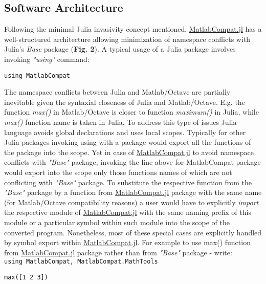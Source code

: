 \subsection{Software Architecture}
\label{Architecture} 

Following the minimal Julia invasivity concept mentioned, \href{https://github.com/MatlabCompat/MatlabCompat.jl}{MatlabCompat.jl} has a well-structured architecture allowing minimization of namespace conflicts with Julia's \textit{Base} package (\textbf{Fig. 2}). A typical usage of a Julia package involves invoking \textit{"using"} command:

\verb|using MatlabCompat|

The namespace conflicts between Julia and Matlab/Octave are partially inevitable given the syntaxial closeness of Julia and Matlab/Octave. E.g. the function \textit{max()} in Matlab/Octave is closer to function \textit{maximum()} in Julia, while \textit{max()} function name is taken in Julia. To address this type of issues Julia language avoids global declarations and uses local scopes. Typically for other Julia packages invoking using with a package would export all the functions of the package into the scope. Yet in case of \href{https://github.com/MatlabCompat/MatlabCompat.jl}{MatlabCompat.jl} to avoid namespace conflicts with \textit{"Base"} package, invoking the line above for MatlabCompat package would export into the scope only those functions names of which are not conflicting with \textit{"Base"} package. To substitute the respective function from the \textit{"Base"} package by a function from \href{https://github.com/MatlabCompat/MatlabCompat.jl}{MatlabCompat.jl} package with the same name (for Matlab/Octave compatibility reasons) a user would have to explicitly \textit{import} the respective module of \href{https://github.com/MatlabCompat/MatlabCompat.jl}{MatlabCompat.jl} with the same naming prefix of this module or a particular symbol within such module into the scope of the converted program. Nonetheless, most of these special cases are explicitly handled by symbol export within \href{https://github.com/MatlabCompat/MatlabCompat.jl}{MatlabCompat.jl}. For example to use max() function from \href{https://github.com/MatlabCompat/MatlabCompat.jl}{MatlabCompat.jl} package rather than from \textit{"Base"} package - write:\\

\verb|using MatlabCompat, MatlabCompat.MathTools|

\verb|max([1 2 3])|

